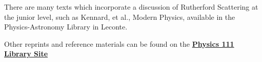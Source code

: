 \documentclass{../lab}
\begin{document}
There are many texts which incorporate a discussion of Rutherford Scattering at the junior level, such as Kennard, et al., Modern Physics, available in the Physics-Astronomy Library in Leconte.

Other reprints and reference materials can be found on the \href{http://physics111.lib.berkeley.edu/Physics111/Reprints/RUT/RUT\_index.html}{\textbf{Physics 111 Library Site}}
\end{document}
